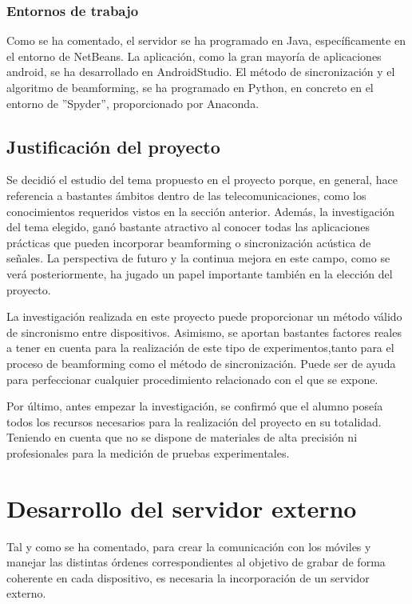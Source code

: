 \documentclass[a4paper,11pt]{book}
\begin{document}
		\subsection{Entornos de trabajo}
	Como se ha comentado, el servidor se ha programado en Java, específicamente en el entorno de NetBeans. La aplicación, como la gran mayoría de aplicaciones android, se ha desarrollado en AndroidStudio. El método de sincronización y el algoritmo de beamforming, se ha programado en Python, en concreto en el entorno de ''Spyder'', proporcionado por Anaconda.
		
	\section{Justificación del proyecto}
	
Se decidió el estudio del tema propuesto en el proyecto porque, en general, hace referencia a bastantes ámbitos dentro de las telecomunicaciones, como los conocimientos requeridos vistos en la sección anterior. Además, la investigación del tema elegido, ganó bastante atractivo al conocer todas las aplicaciones prácticas que pueden incorporar beamforming o sincronización acústica de señales. La perspectiva de futuro y la continua mejora en este campo, como se verá posteriormente, ha jugado un papel importante también en la elección del proyecto.

La investigación realizada en este proyecto puede proporcionar un método válido de sincronismo entre dispositivos. Asimismo, se aportan bastantes factores reales a tener en cuenta para la realización de este tipo de experimentos,tanto para el proceso de beamforming como el método de sincronización. Puede ser de ayuda para perfeccionar cualquier procedimiento relacionado con el que se expone.

Por último, antes empezar la investigación, se confirmó que el alumno poseía todos los recursos necesarios para la realización del proyecto en su totalidad. Teniendo en cuenta que no se dispone de materiales de alta precisión ni profesionales para la medición de pruebas experimentales.
	

\chapter{Desarrollo del servidor externo}
	Tal y como se ha comentado, para crear la comunicación con los móviles y manejar las distintas órdenes correspondientes al objetivo de grabar de forma coherente en cada dispositivo, es necesaria la incorporación de un servidor externo.
	
\end{document}
